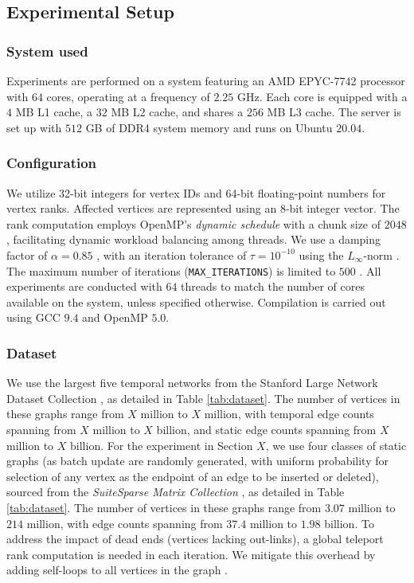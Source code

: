 \subsection{Experimental Setup}
\label{sec:setup}

\subsubsection{System used}

Experiments are performed on a system featuring an AMD EPYC-7742 processor with $64$ cores, operating at a frequency of $2.25$ GHz. Each core is equipped with a $4$ MB L1 cache, a $32$ MB L2 cache, and shares a $256$ MB L3 cache. The server is set up with $512$ GB of DDR4 system memory and runs on Ubuntu $20.04$.


\subsubsection{Configuration}

We utilize 32-bit integers for vertex IDs and 64-bit floating-point numbers for vertex ranks. Affected vertices are represented using an 8-bit integer vector. The rank computation employs OpenMP's \textit{dynamic schedule} with a chunk size of $2048$, facilitating dynamic workload balancing among threads. We use a damping factor of $\alpha = 0.85$ \cite{rank-langville06}, with an iteration tolerance of $\tau = 10^{-10}$ using the $L_\infty$-norm \cite{rank-dubey22, rank-plimpton11}. The maximum number of iterations (\texttt{MAX\_ITERATIONS}) is limited to $500$ \cite{nvgraph}. All experiments are conducted with $64$ threads to match the number of cores available on the system, unless specified otherwise. Compilation is carried out using GCC $9.4$ and OpenMP $5.0$.


\subsubsection{Dataset}

We use the largest five temporal networks from the Stanford Large Network Dataset Collection \cite{snapnets}, as detailed in Table \ref{tab:dataset}. The number of vertices in these graphs range from $X$ million to $X$ million, with temporal edge counts spanning from $X$ million to $X$ billion, and static edge counts spanning from $X$ million to $X$ billion. For the experiment in Section $X$, we use four classes of static graphs (as batch update are randomly generated, with uniform probability for selection of any vertex as the endpoint of an edge to be inserted or deleted), sourced from the \textit{SuiteSparse Matrix Collection} \cite{suite19}, as detailed in Table \ref{tab:dataset}. The number of vertices in these graphs range from $3.07$ million to $214$ million, with edge counts spanning from $37.4$ million to $1.98$ billion. To address the impact of dead ends (vertices lacking out-links), a global teleport rank computation is needed in each iteration. We mitigate this overhead by adding self-loops to all vertices in the graph \cite{rank-andersen07, rank-langville06}.


